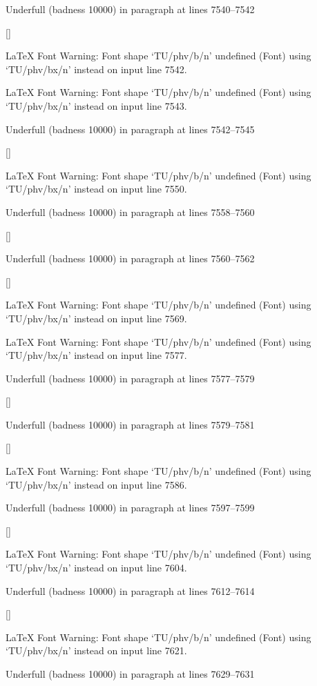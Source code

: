 Underfull \hbox (badness 10000) in paragraph at lines 7540--7542

 []


LaTeX Font Warning: Font shape `TU/phv/b/n' undefined
(Font)              using `TU/phv/bx/n' instead on input line 7542.


LaTeX Font Warning: Font shape `TU/phv/b/n' undefined
(Font)              using `TU/phv/bx/n' instead on input line 7543.


Underfull \hbox (badness 10000) in paragraph at lines 7542--7545

 []


LaTeX Font Warning: Font shape `TU/phv/b/n' undefined
(Font)              using `TU/phv/bx/n' instead on input line 7550.


Underfull \hbox (badness 10000) in paragraph at lines 7558--7560

 []


Underfull \hbox (badness 10000) in paragraph at lines 7560--7562

 []


LaTeX Font Warning: Font shape `TU/phv/b/n' undefined
(Font)              using `TU/phv/bx/n' instead on input line 7569.


LaTeX Font Warning: Font shape `TU/phv/b/n' undefined
(Font)              using `TU/phv/bx/n' instead on input line 7577.


Underfull \hbox (badness 10000) in paragraph at lines 7577--7579

 []


Underfull \hbox (badness 10000) in paragraph at lines 7579--7581

 []


LaTeX Font Warning: Font shape `TU/phv/b/n' undefined
(Font)              using `TU/phv/bx/n' instead on input line 7586.


Underfull \hbox (badness 10000) in paragraph at lines 7597--7599

 []


LaTeX Font Warning: Font shape `TU/phv/b/n' undefined
(Font)              using `TU/phv/bx/n' instead on input line 7604.


Underfull \hbox (badness 10000) in paragraph at lines 7612--7614

 []


LaTeX Font Warning: Font shape `TU/phv/b/n' undefined
(Font)              using `TU/phv/bx/n' instead on input line 7621.


Underfull \hbox (badness 10000) in paragraph at lines 7629--7631

